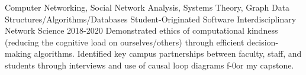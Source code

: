 \begin{cventries}
  \cventry
    {Computer Networking, Social Network Analysis, Systems Theory, Graph Data Structures/Algorithms/Databases} %
    {Student-Originated Software} %
    {Interdisciplinary Network Science} %
    {2018-2020} %
    {Demonstrated ethics of computational kindness (reducing the cognitive load on ourselves/others) through efficient decision-making algorithms. Identified key campus partnerships between faculty, staff, and students through interviews and use of causal loop diagrams f-0or my capstone.}

\end{cventries}
